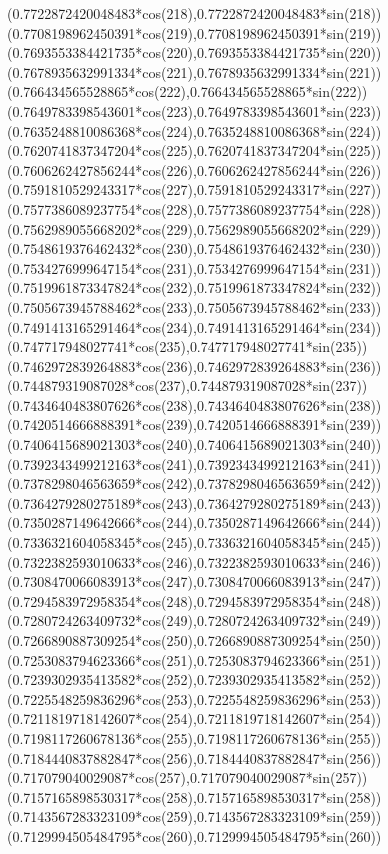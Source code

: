 {({0.7722872420048483*cos(218)},{0.7722872420048483*sin(218)})
({0.7708198962450391*cos(219)},{0.7708198962450391*sin(219)})
({0.7693553384421735*cos(220)},{0.7693553384421735*sin(220)})
({0.7678935632991334*cos(221)},{0.7678935632991334*sin(221)})
({0.766434565528865*cos(222)},{0.766434565528865*sin(222)})
({0.7649783398543601*cos(223)},{0.7649783398543601*sin(223)})
({0.7635248810086368*cos(224)},{0.7635248810086368*sin(224)})
({0.7620741837347204*cos(225)},{0.7620741837347204*sin(225)})
({0.7606262427856244*cos(226)},{0.7606262427856244*sin(226)})
({0.7591810529243317*cos(227)},{0.7591810529243317*sin(227)})
({0.7577386089237754*cos(228)},{0.7577386089237754*sin(228)})
({0.7562989055668202*cos(229)},{0.7562989055668202*sin(229)})
({0.7548619376462432*cos(230)},{0.7548619376462432*sin(230)})
({0.7534276999647154*cos(231)},{0.7534276999647154*sin(231)})
({0.7519961873347824*cos(232)},{0.7519961873347824*sin(232)})
({0.7505673945788462*cos(233)},{0.7505673945788462*sin(233)})
({0.7491413165291464*cos(234)},{0.7491413165291464*sin(234)})
({0.747717948027741*cos(235)},{0.747717948027741*sin(235)})
({0.7462972839264883*cos(236)},{0.7462972839264883*sin(236)})
({0.744879319087028*cos(237)},{0.744879319087028*sin(237)})
({0.7434640483807626*cos(238)},{0.7434640483807626*sin(238)})
({0.7420514666888391*cos(239)},{0.7420514666888391*sin(239)})
({0.7406415689021303*cos(240)},{0.7406415689021303*sin(240)})
({0.7392343499212163*cos(241)},{0.7392343499212163*sin(241)})
({0.7378298046563659*cos(242)},{0.7378298046563659*sin(242)})
({0.7364279280275189*cos(243)},{0.7364279280275189*sin(243)})
({0.7350287149642666*cos(244)},{0.7350287149642666*sin(244)})
({0.7336321604058345*cos(245)},{0.7336321604058345*sin(245)})
({0.7322382593010633*cos(246)},{0.7322382593010633*sin(246)})
({0.7308470066083913*cos(247)},{0.7308470066083913*sin(247)})
({0.7294583972958354*cos(248)},{0.7294583972958354*sin(248)})
({0.7280724263409732*cos(249)},{0.7280724263409732*sin(249)})
({0.7266890887309254*cos(250)},{0.7266890887309254*sin(250)})
({0.7253083794623366*cos(251)},{0.7253083794623366*sin(251)})
({0.7239302935413582*cos(252)},{0.7239302935413582*sin(252)})
({0.7225548259836296*cos(253)},{0.7225548259836296*sin(253)})
({0.7211819718142607*cos(254)},{0.7211819718142607*sin(254)})
({0.7198117260678136*cos(255)},{0.7198117260678136*sin(255)})
({0.7184440837882847*cos(256)},{0.7184440837882847*sin(256)})
({0.717079040029087*cos(257)},{0.717079040029087*sin(257)})
({0.7157165898530317*cos(258)},{0.7157165898530317*sin(258)})
({0.7143567283323109*cos(259)},{0.7143567283323109*sin(259)})
({0.7129994505484795*cos(260)},{0.7129994505484795*sin(260)})
}
